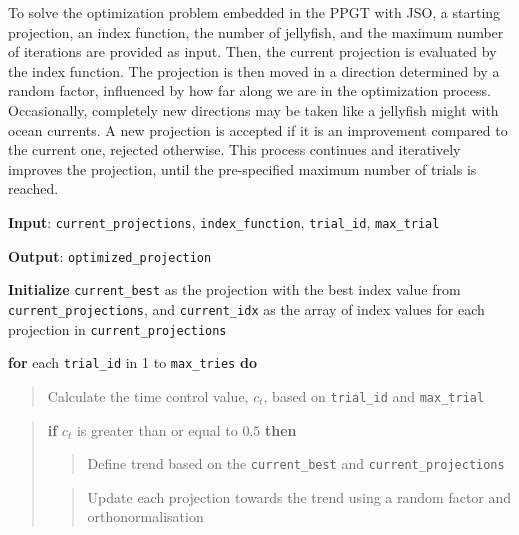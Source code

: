 \documentclass[
  12pt,
]{interact}
\theoremstyle{plain}
\begin{document}
To solve the optimization problem embedded in the PPGT with JSO, a
starting projection, an index function, the number of jellyfish, and the
maximum number of iterations are provided as input. Then, the current
projection is evaluated by the index function. The projection is then
moved in a direction determined by a random factor, influenced by how
far along we are in the optimization process. Occasionally, completely
new directions may be taken like a jellyfish might with ocean currents.
A new projection is accepted if it is an improvement compared to the
current one, rejected otherwise. This process continues and iteratively
improves the projection, until the pre-specified maximum number of
trials is reached.

\begin{tcolorbox}[enhanced jigsaw, breakable, titlerule=0mm, coltitle=black, colframe=quarto-callout-note-color-frame, rightrule=.15mm, bottomtitle=1mm, colback=white, opacityback=0, leftrule=.75mm, opacitybacktitle=0.6, toprule=.15mm, left=2mm, toptitle=1mm, title={Algorithm: Jellyfish Optimizer Pseudo Code}, arc=.35mm, colbacktitle=quarto-callout-note-color!10!white, bottomrule=.15mm]

\textbf{Input}: \texttt{current\_projections}, \texttt{index\_function},
\texttt{trial\_id}, \texttt{max\_trial}

\textbf{Output}: \texttt{optimized\_projection}

\textbf{Initialize} \texttt{current\_best} as the projection with the
best index value from \texttt{current\_projections}, and
\texttt{current\_idx} as the array of index values for each projection
in \texttt{current\_projections}

\textbf{for} each \texttt{trial\_id} in 1 to \texttt{max\_tries}
\textbf{do}

\begin{quote}
Calculate the time control value, \(c_t\), based on \texttt{trial\_id}
and \texttt{max\_trial}
\end{quote}

\begin{quote}
\textbf{if} \(c_t\) is greater than or equal to \(0.5\) \textbf{then}

\begin{quote}
Define trend based on the \texttt{current\_best} and
\texttt{current\_projections}
\end{quote}

\begin{quote}
Update each projection towards the trend using a random factor and
orthonormalisation
\end{quote}


\end{quote}
\end{tcolorbox}
\end{document}
